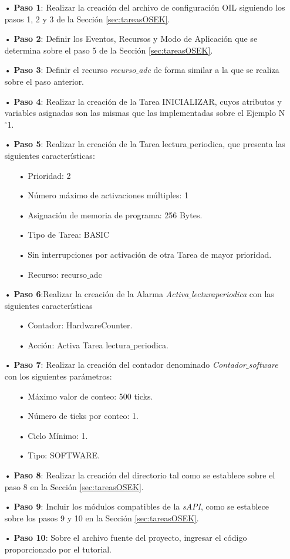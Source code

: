 \documentclass[12pt,letterpaper]{article}
\begin{document}
\begin{enumerate}
\item[•]\textbf{Paso 1}: Realizar la creación del archivo de configuración OIL siguiendo los pasos 1, 2 y 3 de la Sección \ref{sec:tareasOSEK}.
\item[•]\textbf{Paso 2}: Definir los Eventos, Recursos y Modo de Aplicación que se determina sobre el paso 5 de la Sección \ref{sec:tareasOSEK}.
\item[•]\textbf{Paso 3}: Definir el recurso \textit{recurso$\_$adc} de forma similar a la que se realiza sobre el paso anterior.
\item[•]\textbf{Paso 4}: Realizar la creación de la Tarea INICIALIZAR, cuyos atributos y variables asignadas son las mismas que las implementadas sobre el Ejemplo N$^{\circ}$1.
\item[•]\textbf{Paso 5}: Realizar la creación de la Tarea lectura$\_$periodica, que presenta las siguientes características:
\begin{enumerate}
\item[•]Prioridad: 2
\item[•]Número máximo de activaciones múltiples: 1
\item[•]Asignación de memoria de programa: 256 Bytes.
\item[•]Tipo de Tarea: BASIC
\item[•]Sin interrupciones por activación de otra Tarea de mayor prioridad.
\item[•]Recurso: recurso$\_$adc
\end{enumerate}
\item[•]\textbf{Paso 6}:Realizar la creación de la Alarma \textit{Activa$\_$lecturaperiodica} con las siguientes características
\begin{enumerate}
\item[•]Contador: HardwareCounter.
\item[•]Acción: Activa Tarea lectura$\_$periodica.
\end{enumerate}
\item[•]\textbf{Paso 7}: Realizar la creación del contador denominado \textit{Contador$\_$software} con los siguientes parámetros:
\begin{enumerate}
\item[•]Máximo valor de conteo: 500 ticks.
\item[•]Número de ticks por conteo: 1. 
\item[•]Ciclo Mínimo: 1.
\item[•]Tipo: SOFTWARE.
\end{enumerate}
\item[•]\textbf{Paso 8}: Realizar la creación del directorio tal como se establece sobre el paso 8 en la Sección \ref{sec:tareasOSEK}.
\item[•]\textbf{Paso 9}: Incluir los módulos compatibles de la \textit{sAPI}, como se establece sobre los pasos 9 y 10 en la Sección \ref{sec:tareasOSEK}.
\item[•]\textbf{Paso 10}: Sobre el archivo fuente del proyecto, ingresar el código proporcionado por el tutorial.


\end{enumerate}
\end{document}
